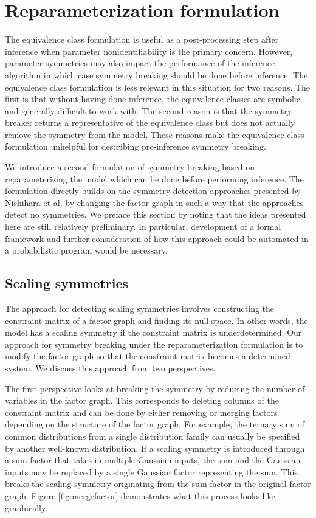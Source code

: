 

\section{Reparameterization formulation}

The equivalence class formulation is useful as a post-processing step after inference when parameter nonidentifiability is the primary concern. However, parameter symmetries may also impact the performance of the inference algorithm in which case symmetry breaking should be done before inference. The equivalence class formulation is less relevant in this situation for two reasons. The first is that without having done inference, the equivalence classes are symbolic and generally difficult to work with. The second reason is that the symmetry breaker returns a representative of the equivalence class but does not actually remove the symmetry from the model. These reasons make the equivalence class formulation unhelpful for describing pre-inference symmetry breaking.

We introduce a second formulation of symmetry breaking based on reparameterizing the model which can be done before performing inference. The formulation directly builds on the symmetry detection approaches presented by Nishihara et al. \cite{Nishihara:2013} by changing the factor graph in such a way that the approaches detect no symmetries. We preface this section by noting that the ideas presented here are still relatively preliminary. In particular, development of a formal framework and further consideration of how this approach could be automated in a probabilistic program would be necessary.


\subsection{Scaling symmetries}

The approach for detecting scaling symmetries involves constructing the constraint matrix of a factor graph and finding its null space. In other words, the model has a scaling symmetry if the constraint matrix is underdetermined. Our approach for symmetry breaking under the reparameterization formulation is to modify the factor graph so that the constraint matrix becomes a determined system. We discuss this approach from two perspectives. 

The first perspective looks at breaking the symmetry by reducing the number of variables in the factor graph. This corresponds to deleting columns of the constraint matrix and can be done by either removing or merging factors depending on the structure of the factor graph. For example, the ternary sum of common distributions from a single distribution family can usually be specified by another well-known distribution. If a scaling symmetry is introduced through a sum factor that takes in multiple Gaussian inputs, the sum and the Gaussian inputs may be replaced by a single Gaussian factor representing the sum. This breaks the scaling symmetry originating from the sum factor in the original factor graph. Figure \ref{fig:mergefactor} demonstrates what this process looks like graphically.

